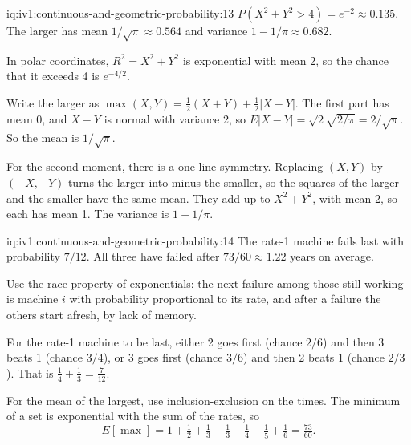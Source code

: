 \begin{solution}{iq:iv1:continuous-and-geometric-probability:13}
$P(X^2 + Y^2 > 4) = e^{-2} \approx 0.135$. The larger has mean $1/\sqrt{\pi} \approx 0.564$ and variance $1 - 1/\pi \approx 0.682$.

In polar coordinates, $R^2 = X^2 + Y^2$ is exponential with mean 2, so the chance that it exceeds 4 is $e^{-4/2}$.

Write the larger as $\max(X, Y) = \tfrac12(X + Y) + \tfrac12|X - Y|$. The first part has mean 0, and $X - Y$ is normal with variance 2, so $E|X - Y| = \sqrt{2}\sqrt{2/\pi} = 2/\sqrt{\pi}$. So the mean is $1/\sqrt{\pi}$.

For the second moment, there is a one-line symmetry. Replacing $(X, Y)$ by $(-X, -Y)$ turns the larger into minus the smaller, so the squares of the larger and the smaller have the same mean. They add up to $X^2 + Y^2$, with mean 2, so each has mean 1. The variance is $1 - 1/\pi$.

\end{solution}

\begin{solution}{iq:iv1:continuous-and-geometric-probability:14}
The rate-1 machine fails last with probability $7/12$. All three have failed after $73/60 \approx 1.22$ years on average.

Use the race property of exponentials: the next failure among those still working is machine $i$ with probability proportional to its rate, and after a failure the others start afresh, by lack of memory.

For the rate-1 machine to be last, either 2 goes first (chance $2/6$) and then 3 beats 1 (chance $3/4$), or 3 goes first (chance $3/6$) and then 2 beats 1 (chance $2/3$). That is $\tfrac14 + \tfrac13 = \tfrac{7}{12}$.

For the mean of the largest, use inclusion-exclusion on the times. The minimum of a set is exponential with the sum of the rates, so
\[
E[\max] = 1 + \tfrac12 + \tfrac13 - \tfrac13 - \tfrac14 - \tfrac15 + \tfrac16 = \tfrac{73}{60}.
\]
\end{solution}

